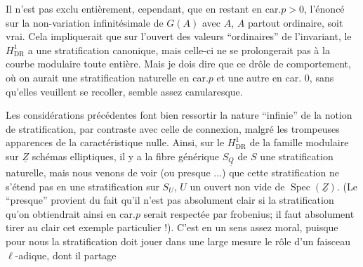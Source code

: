 
Il n'est pas exclu entièrement, cependant, que en restant en car.$p>0$, l'énoncé sur la non-variation  infinitésimale de $G(A)$ avec $A$, $A$ partout ordinaire, soit vrai. Cela impliquerait que sur l'ouvert des valeurs ``ordinaires'' de l'invariant, le $H^1_{\operatorname{DR}}$ a une stratification canonique, mais celle-ci ne se prolongerait pas à la courbe modulaire toute entière. Mais je dois dire que ce drôle de comportement, où on aurait une stratification naturelle en car.$p$ et une autre en car. 0, sans qu'elles veuillent se recoller, semble assez canularesque.

\inserted{[}Les considérations précédentes font bien ressortir la nature ``infinie'' de la notion de stratification, par contraste avec celle de connexion, malgré les trompeuses apparences de la caractéristique nulle. Ainsi, sur le $H^1_{\operatorname{DR}}$ de la famille modulaire sur $\underline{Z}$   schémas elliptiques, il y a   la fibre générique $S_{\underline{Q}}$ de $S$ une stratification naturelle, mais nous venons de voir (ou presque ...) que cette stratification ne s'étend pas en une stratification sur $S_U$, $U$ un ouvert non vide de $\operatorname{Spec}(\underline{Z})$. (Le ``presque'' provient du fait qu'il n'est pas absolument clair si la stratification qu'on obtiendrait ainsi en car.$p$ serait respectée par frobenius; il faut absolument tirer au clair cet exemple particulier !). C'est en un sens assez moral, puisque pour nous la  stratification doit jouer dans une large mesure le rôle d'un faisceau $\ell$-adique, dont il partage
